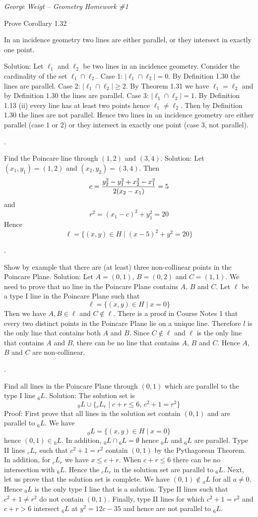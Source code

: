 \parindent=0pt

{\it George Weigt -- Geometry Homework \#1}

\beginsection Prove Corollary 1.32

In an incidence geometry two lines are either parallel,
or they intersect in exactly one point.

\medskip
Solution: Let $\ell_1$ and $\ell_2$ be two lines in an incidence geometry.
Consider the cardinality of the set $\ell_1\cap\ell_2$.
\medskip
Case 1: $|\ell_1\cap\ell_2|=0$. By Definition 1.30 the lines are parallel.
\medskip
Case 2: $|\ell_1\cap\ell_2|\ge2$. By Theorem 1.31 we have $\ell_1=\ell_2$
and by Definition 1.30 the lines are parallel.
\medskip
Case 3: $|\ell_1\cap\ell_2|=1$.
By Definition 1.13 (ii) every line has at least two points hence
$\ell_1\ne\ell_2$. Then by Definition 1.30 the lines are not parallel.
\medskip
Hence two lines in an incidence geometry are either parallel (case 1 or 2)
or they intersect in exactly one point (case 3, not parallel).

.

Find the Poincare line through $(1,2)$ and $(3,4)$.
\medskip
Solution: Let $(x_1,y_1)=(1,2)$ and $(x_2,y_2)=(3,4)$.
Then
$$c={y_2^2-y_1^2+x_2^2-x_1^2\over2(x_2-x_1)}=5$$
and
$$r^2=(x_1-c)^2+y_1^2=20$$
Hence
$$\ell=\{(x,y)\in H\mid(x-5)^2+y^2=20\}$$

.

Show by example that there are (at least) three non-collinear points in
the Poincare Plane.
\medskip
Solution: Let $A=(0,1)$, $B=(0,2)$ and $C=(1,1)$.
We need to prove that no line in the Poincare Plane contains $A$, $B$ and $C$.
Let $\ell$ be a type I line in the Poincare Plane such that
$$\ell=\{(x,y)\in H\mid x=0\}$$
Then we have $A,B\in\ell$ and $C\not\in\ell$.
There is a proof in Course Notes 1 that every two distinct points
in the Poincare Plane lie on a unique line.
Therefore $l$ is the only line that contains both $A$ and $B$.
Since $C\not\in\ell$ and $\ell$ is the only line that contains
$A$ and $B$, there can be no line that contains $A$, $B$ and $C$.
Hence $A$, $B$ and $C$ are non-collinear.

.

Find all lines in the Poincare Plane through $(0,1)$ which are
parallel to the type I line ${}_6L$.
\medskip
Solution: The solution set is
$${}_0L\cup\{{}_cL_r\mid c+r\le6,\,c^2+1=r^2\}$$
Proof: First prove that all lines in the solution set contain $(0,1)$
and are parallel to ${}_6L$. We have
$${}_0L=\{(x,y)\in H\mid x=0\}$$
hence $(0,1)\in{}_0L$. In addition, ${}_0L\cap{}_6L=\emptyset$
hence ${}_0L$ and ${}_6L$ are parallel.
Type II lines ${}_cL_r$ such that $c^2+1=r^2$ contain $(0,1)$ by the
Pythagorean Theorem.
In addition, for ${}_cL_r$ we have $x\le c+r$. When $c+r\le 6$ there can be no
intersection with ${}_6L$.
Hence the ${}_cL_r$ in the solution set are parallel to ${}_6L$.
\medskip
Next, let us prove that the solution set is complete.
We have $(0,1)\not\in{}_aL$ for all $a\ne0$.
Hence ${}_0L$ is the only type I line that is a solution.
Type II lines such that $c^2+1\ne r^2$ do not contain $(0,1)$.
Finally, type II lines for which $c^2+1=r^2$ and $c+r>6$ intersect ${}_6L$ at $y^2=12c-35$ and hence
are not parallel to ${}_6L$.

